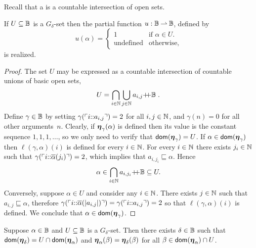 %
Recall that a  is a countable intersection of open sets.

\begin{lemma}
  \label{th:G_delta_characteristic}%
  If $U \subseteq \mathbb{B}$ is a $G_\delta$-set then the partial
  function $u: \mathbb{B} \mathbin{\rightharpoonup} \mathbb{B}$, defined by
  \begin{equation*}
    u(\alpha) =
    \begin{cases}
      1 & \text{if $\alpha \in U$.}\\
      \text{undefined} & \text{otherwise,}
    \end{cases}
  \end{equation*}
  is realized.
\end{lemma}

\begin{proof}
  The set $U$ may be expressed as a countable intersection of countable unions of basic
  open sets,
  \begin{equation*}
    U = \bigcap_{i \in \mathbb{N}}
        \bigcup_{j \in \mathbb{N}} a_{i,j}{{+}\!\!{+}}\mathbb{B} \;.
  \end{equation*}
  Define $\gamma \in \mathbb{B}$ by setting
  $\gamma(\ulcorner i {:}{:} a_{i,j} \urcorner) = 2$ for all $i, j \in \mathbb{N}$,
  and $\gamma(n) = 0$ for all other arguments~$n$. Clearly, if
  $\text{\boldmath{$\eta$}}_{\gamma}(\alpha)$ is defined then its value is the constant
  sequence $1, 1, 1, \ldots$, so we only need to verify that
  $\mathsf{dom}(\text{\boldmath{$\eta$}}_\gamma) = U$. If $\alpha \in \mathsf{dom}(\text{\boldmath{$\eta$}}_\gamma)$ then
  $\ell(\gamma,\alpha)(i)$ is defined for every $i \in \mathbb{N}$.
  For every $i \in \mathbb{N}$ there exists $j_i \in \mathbb{N}$ such that $\gamma
  (\ulcorner i {:}{:} \overline{\alpha}(j_i) \urcorner) = 2$, which implies that $
  a_{i, j_i} \sqsubseteq \alpha$. Hence
  \begin{equation*}
    \alpha \in \bigcap_{i \in \mathbb{N}} a_{i, j_i}{{+}\!\!{+}}\mathbb{B} \subseteq U.
  \end{equation*}
  Conversely, suppose $\alpha \in U$ and consider any $i \in \mathbb{N}$.
  There exists $j \in \mathbb{N}$ such that $a_{i,j} \sqsubseteq \alpha$,
  therefore $\gamma (\ulcorner i {:}{:} \overline{\alpha}(|a_{i,j}|) \urcorner) =
  \gamma(\ulcorner i {:}{:} a_{i,j} \urcorner) = 2$ so that $\ell(\gamma,\alpha)(i)$ is defined. We conclude that $\alpha \in
  \mathsf{dom}(\text{\boldmath{$\eta$}}_\gamma)$.
\end{proof}

\begin{lemma}
  \label{th:restrict_G_delta}%
  Suppose $\alpha \in \mathbb{B}$ and $U \subseteq \mathbb{B}$ is a $G_\delta$-set.
  Then there exists $\delta \in \mathbb{B}$ such that
  $\mathsf{dom}(\text{\boldmath{$\eta$}}_\delta) = U \cap \mathsf{dom}(\text{\boldmath{$\eta$}}_\alpha)$
  and
  $\text{\boldmath{$\eta$}}_{\alpha}(\beta) = \text{\boldmath{$\eta$}}_{\delta}(\beta)$
  for all $\beta \in \mathsf{dom}(\text{\boldmath{$\eta$}}_\alpha) \cap U$.
\end{lemma}

